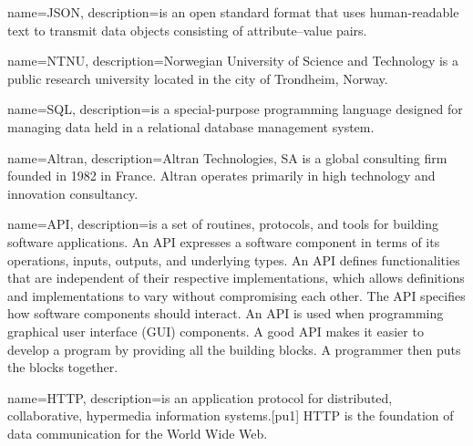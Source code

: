 \documentclass[../document]{subfiles}
\begin{document}
 {
   name=JSON,
   description={is an open standard format that uses human-readable text to transmit data objects consisting of attribute–value pairs.}
}

{
   name=NTNU,
   description={Norwegian University of Science and Technology is a public research university located in the city of Trondheim, Norway.}
}

{
   name=SQL,
   description={is a special-purpose programming language designed for managing data held in a relational database management system.}
}

{
   name=Altran,
   description={Altran Technologies, SA is a global consulting firm founded in 1982 in France. Altran operates primarily in high technology and innovation consultancy.}
}

{
   name=API,
   description={is a set of routines, protocols, and tools for building software applications. An API expresses a software component in terms of its operations, inputs, outputs, and underlying types. An API defines functionalities that are independent of their respective implementations, which allows definitions and implementations to vary without compromising each other. The API specifies how software components should interact. An API is used when programming graphical user interface (GUI) components. A good API makes it easier to develop a program by providing all the building blocks. A programmer then puts the blocks together.}
}

{
   name=HTTP,
   description={is an application protocol for distributed, collaborative, hypermedia information systems.[pu1] HTTP is the foundation of data communication for the World Wide Web.}
}
\end{document}
